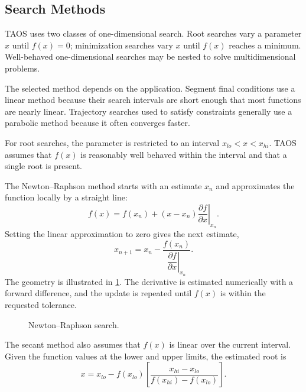 \subsection{Search Methods}\label{sec:search-methods}

TAOS uses two classes of one-dimensional search. Root searches vary a parameter
$x$ until $f(x)=0$; minimization searches vary $x$ until $f(x)$ reaches a minimum.
Well-behaved one-dimensional searches may be nested to solve multidimensional
problems.

The selected method depends on the application. Segment final conditions use a
linear method because their search intervals are short enough that most functions are
nearly linear. Trajectory searches used to satisfy constraints generally use a
parabolic method because it often converges faster.

For root searches, the parameter is restricted to an interval
$x_{lo}<x<x_{hi}$. TAOS assumes that $f(x)$ is reasonably well behaved within the
interval and that a single root is present.


The Newton--Raphson method starts with an estimate $x_n$ and approximates the
function locally by a straight line:
\begin{equation}
  f(x)=f(x_n)+(x-x_n)\left.\frac{\partial f}{\partial x}\right|_{x_n}.
  \label{eq:newton-linearization}
\end{equation}
Setting the linear approximation to zero gives the next estimate,
\begin{equation}
  x_{n+1}=x_n-
  \frac{f(x_n)}{\left.\dfrac{\partial f}{\partial x}\right|_{x_n}}.
  \label{eq:newton-update-search}
\end{equation}
The geometry is illustrated in \cref{fig:newton-raphson-search}. The derivative is
estimated numerically with a forward difference, and the update is repeated until
$f(x)$ is within the requested tolerance.

\begin{figure}[htbp]
  \centering
  
  \caption{Newton--Raphson search.}
  \label{fig:newton-raphson-search}
\end{figure}


The secant method also assumes that $f(x)$ is linear over the current interval. Given
the function values at the lower and upper limits, the estimated root is
\begin{equation}
  x=x_{lo}-f(x_{lo})
  \left[
    \frac{x_{hi}-x_{lo}}{f(x_{hi})-f(x_{lo})}
  \right].
  \label{eq:secant-root-estimate}
\end{equation}

